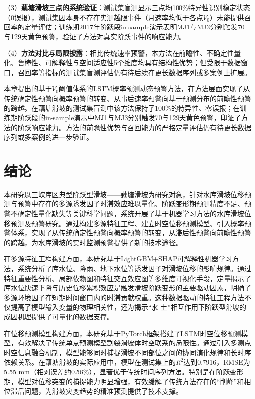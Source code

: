 \documentclass[12pt,a4paper]{article}
\begin{document}
    （3）\textbf{藕塘滑坡三点的系统验证}：测试集盲测显示三点均100\%特异性识别稳定状态（0误报），测试集因本身不存在实测越限事件（月速率均低于各点$V_0$）未能提供召回率的定量评估；训练期2017年阶跃段in-sample演示表明MJ1与MJ3分别触发70与129天黄色预警，验证了方法对真实阶跃事件的响应能力。

    （4）\textbf{方法对比与局限披露}：相比传统速率预警，本方法在前瞻性、不确定性量化、鲁棒性、可解释性与空间适应性5个维度均具有结构性优势；但受限于数据窗口，召回率等指标的测试集盲测评估仍有待后续在更长数据序列或多案例上扩展。

本章提出的基于$V_0$阈值体系的LSTM概率预测动态预警方法，在方法层面实现了从传统确定性预警向概率预警的转变、从事后速率预警向基于预测分布的前瞻性预警的跨越。在藕塘滑坡的测试集盲测中该方法保持了100\%的特异性、零误报；在训练期阶跃段的in-sample演示中MJ1与MJ3分别触发70与129天黄色预警，印证了方法的阶跃响应能力。方法的前瞻性优势与召回能力的严格定量评估仍有待更长数据序列或多案例的进一步验证。
\section{结论}

本研究以三峡库区典型阶跃型滑坡——藕塘滑坡为研究对象，针对水库滑坡位移预测与预警中存在的多源诱发因子时滞效应难以量化、阶跃变形期预测精度不足、预警不确定性量化缺失等关键科学问题，系统开展了基于机器学习方法的水库滑坡位移预测及预警研究。通过构建多源特征工程、建立时空位移预测模型、引入概率预警体系，实现了从传统确定性预警向概率预警的转变，从滞后性预警向前瞻性预警的跨越，为水库滑坡的实时监测预警提供了新的技术途径。

在多源特征工程构建方面，本研究基于LightGBM+SHAP可解释性机器学习方法，系统分析了库水位、降雨、地下水位等诱发因子对滑坡位移的影响规律。通过特征重要性分析、局部依赖图和特征交互效应图等多维度可视化手段，定量揭示了库水位快速下降与历史位移累积效应是触发滑坡阶跃变形的主要驱动因素，明确了多源环境因子在短期时间窗口内的时滞贡献权重。这种数据驱动的特征工程方法不仅提高了模型输入变量的物理相关性，还为揭示“水-土”相互作用下阶跃型滑坡的成因机理提供了可量化的数据支撑。

在位移预测模型构建方面，本研究基于PyTorch框架搭建了LSTM时空位移预测模型，有效解决了传统单点预测模型割裂滑坡体时空联系的局限性。通过引入多测点时空信息融合机制，模型能够同时捕捉滑坡不同部位之间的协同演化规律和长时序依赖关系。在藕塘滑坡的实际应用中，模型在测试集上的$R^2$达到0.7916，RMSE为5.55 mm（相对误差约0.56\%），显著优于传统时间序列方法。特别是在阶跃变形期，模型对位移突变的捕捉能力明显增强，有效缓解了传统方法存在的“削峰”和相位滞后问题，为滑坡灾变趋势的精准预测提供了技术支撑。
\end{document}
